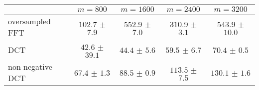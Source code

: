 \centering
\renewcommand{\arraystretch}{1.2}
\begin{tabular}{@{}lcccc@{}}
\toprule
 & $m=800$ & $m=1600$ & $m=2400$ & $m=3200$\\
\midrule
oversampled FFT & $102.7$ $\pm$ $7.9$ & $552.9$ $\pm$ $7.0$ & $310.9$ $\pm$ $3.1$ & $543.9$ $\pm$ $10.0$ \\
DCT & $42.6$ $\pm$ $39.1$ & $44.4$ $\pm$ $5.6$ & $59.5$ $\pm$ $6.7$ & $70.4$ $\pm$ $0.5$ \\
non-negative DCT & $67.4$ $\pm$ $1.3$ & $88.5$ $\pm$ $0.9$ & $113.5$ $\pm$ $7.5$ & $130.1$ $\pm$ $1.6$ \\
\bottomrule
\end{tabular}
